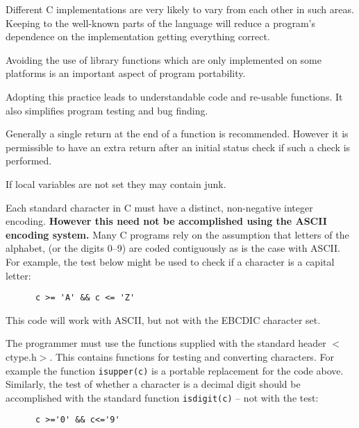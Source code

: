 Different C implementations are very likely to vary from each other 
in such areas.
Keeping to the well-known parts of the language will reduce a 
program's dependence on the implementation getting everything correct.


Avoiding the use of library functions which are only implemented 
on some platforms is an important aspect of program portability.


Adopting this practice leads to understandable code and re-usable 
functions. It also simplifies program testing and bug finding.



Generally a single return at the end of a function is recommended.
However it is permissible to have an extra return after 
an initial status check if such a check is performed.


If local variables are not set they may contain junk.


Each standard character in C must have a distinct, non-negative integer 
encoding.
{\bf However this need not be accomplished using the ASCII encoding system.}
Many C programs rely on the assumption that letters of the alphabet,
(or the digits 0--9) are coded contiguously as is the case with ASCII.
For example, the test below might be used to check if a character is 
a capital letter:
\begin{verbatim}
      c >= 'A' && c <= 'Z'
\end{verbatim}
This code will work with ASCII, but not with the EBCDIC character set.

The programmer must use the functions supplied with the standard 
header $<$ctype.h$>$.
This contains functions for testing and converting characters.
For example the function {\tt isupper(c)} is a portable replacement for the 
code  above.
Similarly, the test of whether a character is a decimal digit 
should be accomplished with the standard function  {\tt isdigit(c)} --
not with the test: 
\begin{verbatim}
      c >='0' && c<='9'\end{verbatim}

